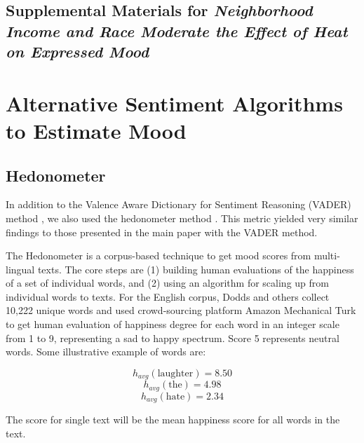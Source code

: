 \documentclass{article}
\begin{document}
\begin{center}
\section*{Supplemental Materials for \textit{Neighborhood Income and Race Moderate the Effect of Heat on Expressed Mood}}
\end{center}

\setcounter{table}{0}
\setcounter{figure}{0}
\setcounter{section}{0}
\renewcommand{\thetable}{S\arabic{table}}
\renewcommand{\thefigure}{S\arabic{figure}}
\renewcommand{\thesection}{S\arabic{section}}

\section{Alternative Sentiment Algorithms to Estimate Mood}

\subsection{Hedonometer}

In addition to the Valence Aware Dictionary for Sentiment Reasoning (VADER) method \cite{gilbert_vader_2014}, we also used the hedonometer method \cite{Dodds2011Dec}.  This metric yielded very similar findings to those presented in the main paper with the VADER method.

The Hedonometer \cite{dodds_temporal_2011} is a corpus-based technique to get mood scores from multi-lingual texts. The core steps are (1) building human evaluations of the happiness of a set of individual words, and (2) using an algorithm for scaling up from individual words to texts. For the English corpus, Dodds and others \cite{dodds_temporal_2011} collect 10,222 unique words and used crowd-sourcing platform Amazon Mechanical Turk to get human evaluation of happiness degree for each word in an integer scale from 1 to 9, representing a sad to happy spectrum. Score 5 represents neutral words. Some illustrative example of words are: 

\[h_{avg} (\text{laughter}) = 8.50 \]
\[h_{avg} (\text{the}) = 4.98\]
\[h_{avg} (\text{hate}) = 2.34\]

The score for single text will be the mean happiness score for all words in the text.
\end{document}
